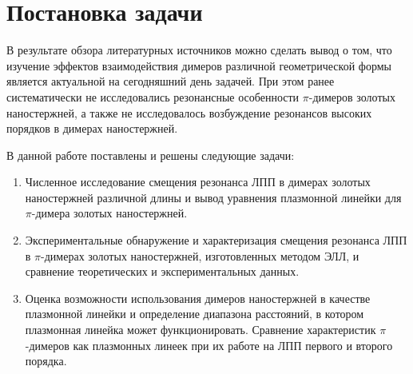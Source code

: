 \section{Постановка задачи}

В результате обзора литературных источников можно сделать вывод о том, что изучение эффектов взаимодействия димеров различной геометрической формы  является актуальной на сегодняшний день задачей. При этом ранее систематически не исследовались резонансные особенности $ \pi $-димеров золотых наностержней, а также не исследовалось возбуждение резонансов высоких порядков в димерах наностержней.

В данной работе поставлены и решены следующие задачи:
\begin{enumerate}
\item Численное исследование смещения резонанса ЛПП в димерах золотых наностержней различной длины и вывод уравнения плазмонной линейки для $ \pi $-димера золотых наностержней.
\item Экспериментальные обнаружение и характеризация смещения резонанса ЛПП в $ \pi $-димерах золотых наностержней, изготовленных методом ЭЛЛ, и сравнение теоретических и экспериментальных данных.
\item Оценка возможности использования димеров наностержней в качестве плазмонной линейки и определение диапазона расстояний, в котором плазмонная линейка может функционировать. Сравнение характеристик $ \pi $-димеров как плазмонных линеек при их работе на ЛПП первого и второго порядка.
\end{enumerate}